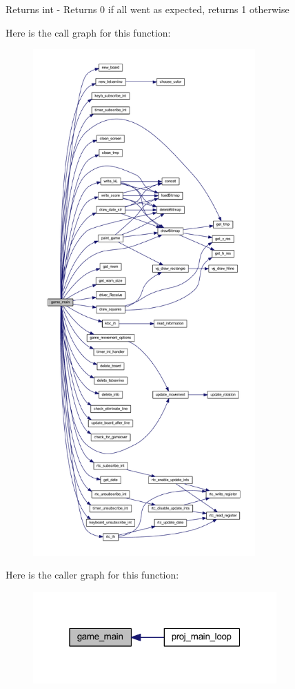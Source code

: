 \begin{DoxyReturn}{Returns}
int -\/ Returns 0 if all went as expected, returns 1 otherwise 
\end{DoxyReturn}
Here is the call graph for this function\+:
\nopagebreak
\begin{figure}[H]
\begin{center}
\leavevmode
\includegraphics[height=550pt]{group__game_gaa449f1959d3595ac0d0b88d643b1acd4_cgraph}
\end{center}
\end{figure}
Here is the caller graph for this function\+:
\nopagebreak
\begin{figure}[H]
\begin{center}
\leavevmode
\includegraphics[width=265pt]{group__game_gaa449f1959d3595ac0d0b88d643b1acd4_icgraph}
\end{center}
\end{figure}
\mbox{\label{group__game_ga553ba6d099151083884ae0d6c1e76771}} 
